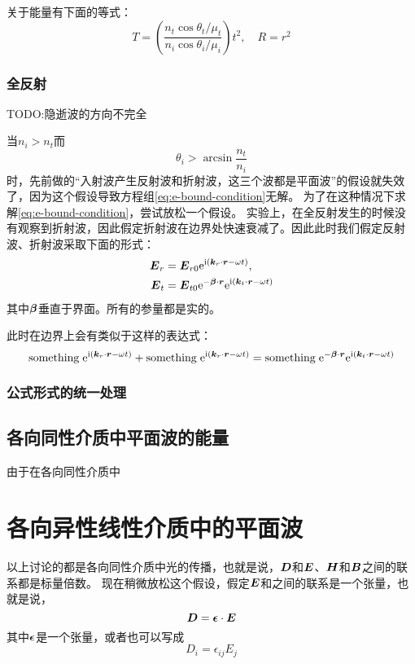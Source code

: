 关于能量有下面的等式：
\begin{equation}
    T = \left( \frac{n_t \cos \theta_t / \mu_t}{n_i \cos \theta_i / \mu_i} \right) t^2, \quad R = r^2
\end{equation}

\subsubsection{全反射}\label{sec:total-reflect}

TODO:隐逝波的方向不完全

当$n_i > n_t$而
\[
    \theta_i > \arcsin \frac{n_t}{n_i}
\]
时，先前做的“入射波产生反射波和折射波，这三个波都是平面波”的假设就失效了，因为这个假设导致方程组\eqref{eq:e-bound-condition}无解。
为了在这种情况下求解\eqref{eq:e-bound-condition}，尝试放松一个假设。
实验上，在全反射发生的时候没有观察到折射波，因此假定折射波在边界处快速衰减了。因此此时我们假定反射波、折射波采取下面的形式：
\[
    \begin{aligned}
        \vb*{E}_r &= \vb*{E}_{r0} \mathrm{e}^{\mathrm{i} (\vb*{k}_r \cdot \vb*{r} - \omega t)}, \\
        \vb*{E}_t &= \vb*{E}_{t0} \mathrm{e}^{-\vb*{\beta} \cdot \vb*{r}} \mathrm{e}^{\mathrm{i} (\vb*{k}_t \cdot \vb*{r} - \omega t)}
    \end{aligned}
\]
其中$\vb*{\beta}$垂直于界面。所有的参量都是实的。

此时在边界上会有类似于这样的表达式：
\[
    \mathrm{something} \; \mathrm{e}^{\mathrm{i} (\vb*{k}_r \cdot \vb*{r} - \omega t)} + \mathrm{something} \; \mathrm{e}^{\mathrm{i} (\vb*{k}_r \cdot \vb*{r} - \omega t)} = \mathrm{something} \; \mathrm{e}^{-\vb*{\beta} \cdot \vb*{r}} \mathrm{e}^{\mathrm{i} (\vb*{k}_t \cdot \vb*{r} - \omega t)}
\]

\subsubsection{公式形式的统一处理}

\subsection{各向同性介质中平面波的能量}

由于在各向同性介质中

\section{各向异性线性介质中的平面波}

以上讨论的都是各向同性介质中光的传播，也就是说，$\vb*{D}$和$\vb*{E}$、$\vb*{H}$和$\vb*{B}$之间的联系都是标量倍数。
现在稍微放松这个假设，假定$\vb*{E}$和之间的联系是一个张量，也就是说，
\[
    \vb*{D} = \vb*{\epsilon} \cdot \vb*{E}
\]
其中$\vb*{\epsilon}$是一个张量，或者也可以写成
\[
    D_i = \epsilon_{ij} E_j
\]

